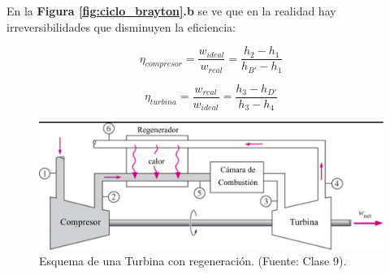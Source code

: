             En la \textbf{Figura \ref{fig:ciclo_brayton}.b} se ve que en la realidad hay irreversibilidades que disminuyen la eficiencia:
            \begin{multicols}{2}
            \begin{equation}
            \label{irr_compr}
                \eta_{compresor}=\frac{w_{ideal}}{w_{real}}=\frac{h_{2}-h_{1}}{h_{B'}-h_{1}}
            \end{equation}
            
            \begin{equation}
            \label{irr_turb}
                \eta_{turbina}=\frac{w_{real}}{w_{ideal}}=\frac{h_{3}-h_{D'}}{h_{3}-h_{4}}
            \end{equation}
            \end{multicols}
            
            
            \begin{figure}
                \includegraphics[width=\textwidth]{img/clases/turbina_reg.png}
                \caption{Esquema de una Turbina con regeneración. (Fuente: Clase 9).}
                \label{fig:turbina_reg}
            \end{figure}
            

